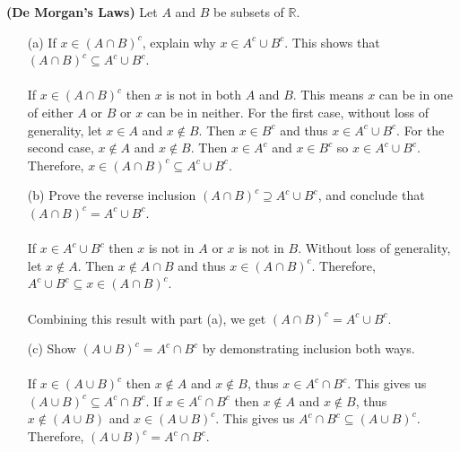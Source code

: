 \documentclass[11pt]{article}
\def\R{{\mathbb{R}}}
\newenvironment{exer}[1]
    {\renewcommand\theinnercustomexer{#1}\innercustomexer\upshape}
    {\endinnercustomexer}
\begin{document}
\begin{exer}{1.2.5} \textbf{(De Morgan's Laws)}
    Let $A$ and $B$ be subsets of $\R$.
    \begin{enumerate}
        \item[(a)]
            If $x\in(A\cap B)^c$, explain why $x\in A^c\cup B^c$. This shows that $(A\cap B)^c\subseteq A^c\cup B^c$. \\ \\
            If $x\in(A\cap B)^c$ then $x$ is not in both $A$ and $B$. This means $x$ can be in one of either $A$ or $B$ or $x$ can be in neither. For the first case, without loss of generality, let $x\in A$ and $x\notin B$. Then $x\in B^c$ and thus $x\in A^c\cup B^c$. For the second case, $x\notin A$ and $x\notin B$. Then $x\in A^c$ and $x\in B^c$ so $x\in A^c\cup B^c$. Therefore, $x\in (A\cap B)^c\subseteq A^c\cup B^c$.
        \item[(b)]
            Prove the reverse inclusion $(A\cap B)^c\supseteq A^c\cup B^c$, and conclude that $(A\cap B)^c=A^c\cup B^c$. \\ \\
            If $x\in A^c\cup B^c$ then $x$ is not in $A$ or $x$ is not in $B$. Without loss of generality, let $x\notin A$. Then $x\notin A\cap B$ and thus $x\in(A\cap B)^c$. Therefore, $A^c\cup B^c\subseteq x\in (A\cap B)^c$. \\ \\
            Combining this result with part (a), we get $(A\cap B)^c=A^c\cup B^c$.
        \item[(c)]
            Show $(A\cup B)^c=A^c\cap B^c$ by demonstrating inclusion both ways. \\ \\
            If $x\in (A\cup B)^c$ then $x\notin A$ and $x\notin B$, thus $x\in A^c\cap B^c$. This gives us $(A\cup B)^c\subseteq A^c\cap B^c$. If $x\in A^c\cap B^c$ then $x\notin A$ and $x\notin B$, thus $x\notin(A\cup B)$ and $x\in(A\cup B)^c$. This gives us $A^c\cap B^c\subseteq(A\cup B)^c$. Therefore, $(A\cup B)^c=A^c\cap B^c$.
    \end{enumerate}
\end{exer}
\end{document}
